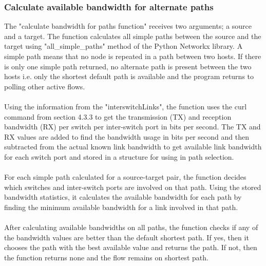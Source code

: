 \documentclass[paper=a4, fontsize=12pt]{scrartcl}	%
\numberwithin{equation}{section}		%
\numberwithin{figure}{section}			%
\numberwithin{table}{section}				%
\begin{document}
\subsubsection{Calculate available bandwidth for alternate paths}
The "calculate bandwidth for paths function" receives two arguments; a source and a target. The function calculates all simple paths between the source and the target using "all\_simple\_paths" method of the Python Networkx library. A simple path means that no node is repeated in a path between two hosts. If there is only one simple path returned, no alternate path is present between the two hosts i.e. only the shortest default path is available and the program returns to polling other active flows.
\\
\\
Using the information from the "interswitchLinks", the function uses the curl command from section 4.3.3 to get the transmission (TX) and reception bandwidth (RX) per switch per inter-switch port in bits per second. The TX and RX values are added to find the bandwidth usage in bits per second and then subtracted from the actual known link bandwidth to get available link bandwidth for each switch port and stored in a structure for using in path selection.
\\
\\
For each simple path calculated for a source-target pair, the function decides which switches and inter-switch ports are involved on that path. Using the stored bandwidth statistics, it calculates the available bandwidth for each path by finding the minimum available bandwidth for a link involved in that path.
\\
\\
After calculating available bandwidths on all paths, the function checks if any of the bandwidth values are better than the default shortest path. If yes, then it chooses the path with the best available value and returns the path. If not, then the function returns none and the flow remains on shortest path.
\end{document}
